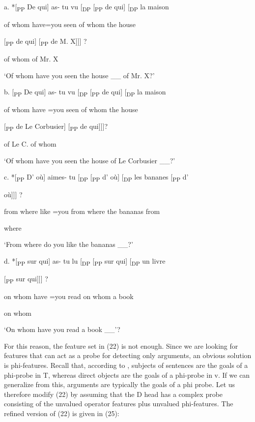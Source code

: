 \documentclass[output=paper]{langsci/langscibook}
\begin{document}
\ea%
    \label{ex:key:24}
    \gll\\
        \\
    \glt
    \z

            a.    *[\textsubscript{PP}  De  qui]  as-  tu  vu  [\textsubscript{DP} [\textsubscript{PP}  de qui] [\textsubscript{DP}   la  maison 

      of  whom  have=you  seen    of whom  the  house  

    [\textsubscript{PP} de  qui] [\textsubscript{PP}  de M. X]]] ?

      of  whom    of Mr. X

    ‘Of whom have you seen the house \_\_ of Mr. X?’

    b.   [\textsubscript{PP}  De  qui]  as-  tu  vu [\textsubscript{DP} [\textsubscript{PP}  de qui] [\textsubscript{DP}  la   maison 

      of  whom  have  =you  seen    of whom  the  house  

    [\textsubscript{PP}  de Le Corbusier] [\textsubscript{PP}  de  qui]]]?

      of Le C.      of  whom

    ‘Of whom have you seen the house of Le Corbusier \_\_?’

    c.    *[\textsubscript{PP}  D’  où]  aimes-  tu [\textsubscript{DP} [\textsubscript{PP}  d’  où] [\textsubscript{DP} les  bananes [\textsubscript{PP}   d’

    où]]] ?

      from  where  like  =you    from  where   the  bananas  from 

where

    ‘From where do you like the bananas \_\_?’

    d.    *[\textsubscript{PP}  sur  qui]  as-  tu  lu [\textsubscript{DP} [\textsubscript{PP}  sur  qui] [\textsubscript{DP} un  livre 

[\textsubscript{PP} sur  qui]]] ?

      on  whom  have  =you  read    on  whom  a  book  

on  whom

    ‘On whom have you read a book \_\_’? 

For this reason, the feature set in (22) is not enough. Since we are looking for features that can act as a probe for detecting only arguments, an obvious solution is phi-features. Recall that, according to \citet{Chomsky2000}, subjects of sentences are the goals of a phi-probe in T, whereas direct objects are the goals of a phi-probe in v. If we can generalize from this, arguments are typically the goals of a phi probe. Let us therefore modify (22) by assuming that the D head has a complex probe consisting of the unvalued operator features plus unvalued phi-features. The refined version of (22) is given in (25):
\end{document}
